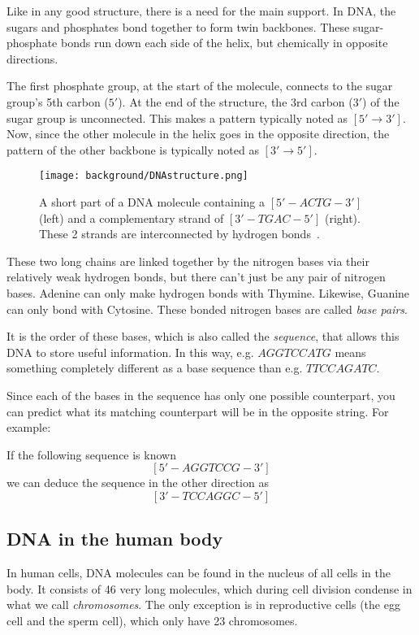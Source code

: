 Like in any good structure, there is a need for the main support. In DNA, the sugars and phosphates bond together to form twin backbones. These sugar-phosphate bonds run down each side of the helix, but chemically in opposite directions. 

The first phosphate group, at the start of the molecule, connects to the sugar group's 5th carbon ($5'$). At the end of the structure, the 3rd carbon ($3'$) of the sugar group is unconnected. This makes a pattern typically noted as $[5' \rightarrow 3']$. Now, since the other molecule in the helix goes in the opposite direction, the pattern of the other backbone is typically noted as $[3' \rightarrow 5']$.

\begin{figure}[H]
	\centering
	\texttt{[image: background/DNAstructure.png]}
	\caption{A short part of a DNA molecule containing a $[5' - ACTG - 3']$ (left) and a complementary strand of $[3' - TGAC - 5']$ (right). These 2 strands are interconnected by hydrogen bonds~\cite{dnachemical}.}
	\label{fig:DNAstructure}
\end{figure}

These two long chains are linked together by the nitrogen bases via their relatively weak hydrogen bonds, but there can't just be any pair of nitrogen bases. Adenine can only make hydrogen bonds with Thymine. Likewise, Guanine can only bond with Cytosine. These bonded nitrogen bases are called \emph{base pairs}.

It is the order of these bases, which is also called the \emph{sequence}, that allows this DNA to store useful information. In this way, e.g. $AGGTCCATG$ means something completely different as a base sequence than e.g. $TTCCAGATC$.

Since each of the bases in the sequence has only one possible counterpart, you can predict what its matching counterpart will be in the opposite string. For example:

If the following sequence is known
$$[5' - AGGTCCG - 3']$$
we can deduce the sequence in the other direction as
$$[3' - TCCAGGC - 5']$$

\subsection{DNA in the human body}

In human cells, DNA molecules can be found in the nucleus of all cells in the body. It consists of 46 very long molecules, which during cell division condense in what we call \emph{chromosomes}. The only exception is in reproductive cells (the egg cell and the sperm cell), which only have 23 chromosomes. 

